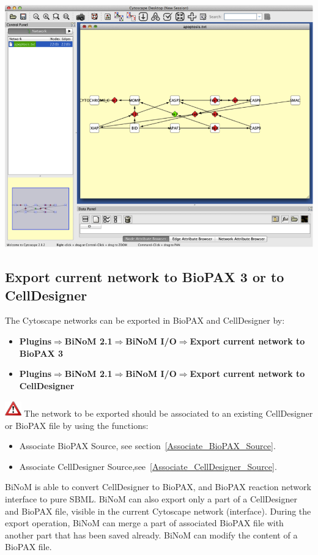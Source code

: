 \includegraphics[width=1\textwidth]{graphics/Import_brff.png} 



\subsection{Export current network to BioPAX 3 or to CellDesigner} \label{Export_current_network}
The Cytoscape networks can be exported in BioPAX and CellDesigner by:
\begin{itemize}
\item \textbf{Plugins$\Rightarrow$BiNoM 2.1$\Rightarrow$BiNoM I/O$\Rightarrow$Export current network to BioPAX 3}
\item \textbf{Plugins$\Rightarrow$BiNoM 2.1$\Rightarrow$BiNoM I/O$\Rightarrow$Export current network to CellDesigner}
\end{itemize}
\includegraphics[width=20pt,height=20pt]{graphics/warning} The network to be exported should be associated to an existing CellDesigner or BioPAX file by using the functions:
\begin{itemize}
\item Associate BioPAX Source, see section~\ref{Associate_BioPAX_Source}.
\item Associate CellDesigner Source,see~\ref{Associate_CellDesigner_Source}.
\end{itemize}
BiNoM is able to convert CellDesigner to BioPAX, and BioPAX
reaction network interface to pure SBML. BiNoM can also export only a
part of a CellDesigner and BioPAX file, visible in the current Cytoscape network
(interface). During the export operation, BiNoM can merge a part of
associated BioPAX file with another part that has been saved already. BiNoM can modify the
content of a BioPAX file. \\\\

